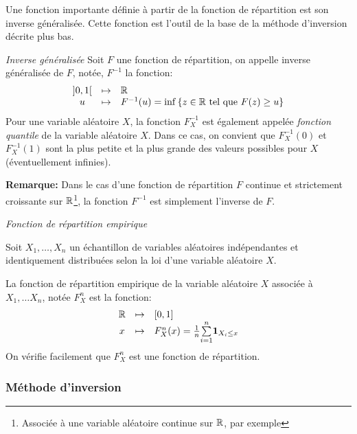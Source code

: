 Une fonction importante définie à partir de la fonction de répartition est son inverse généralisée. 
Cette fonction est l'outil de la base de la méthode d'inversion décrite plus bas.

\begin{definition}{\textit{Inverse généralisée}}
Soit $F$ une fonction de répartition, on appelle inverse généralisée de $F$, notée, $F^{-1}$ la fonction:
\begin{align*}
\begin{array}{ccl}
]0, 1[&\mapsto& \mathbb{R}\\
u &\mapsto& F^{-1}(u) = \inf\left\lbrace z \in \mathbb{R} \text{ tel que } F(z) \geq u \right\rbrace
\end{array}
\end{align*}
Pour une variable aléatoire $X$, la fonction $F_X^{-1}$ est également appelée \textit{fonction quantile} de la variable aléatoire $X$.
Dans ce cas, on convient que $F_X^{-1}(0)$ et $F_X^{-1}(1)$ sont  la plus petite et la plus grande des valeurs possibles pour $X$ (éventuellement infinies).
\end{definition}

\vspace{\baselineskip}
\textbf{Remarque:} Dans le cas d'une fonction de répartition $F$ continue et strictement croissante sur $\mathbb{R}$\footnote{Associée à une variable aléatoire continue sur $\mathbb{R}$, par exemple}, la fonction $F^{-1}$ est simplement l'inverse de $F$.

\begin{definition}{\textit{Fonction de répartition empirique}}

Soit $X_1, \dots, X_n$ un échantillon de variables aléatoires indépendantes et identiquement distribuées selon la loi d'une variable aléatoire $X$.

La fonction de répartition empirique de la variable aléatoire $X$ associée à $X_1,\dots X_n$, notée $F_X^n$ est la fonction:
\[
\begin{array}{ccl}
\mathbb{R} &\mapsto& [0, 1]\\
x &\mapsto& F_X^n(x) = \frac{1}{n}\underset{i=1}{\overset{n}{\sum}} \mathbf{1}_{X_i \leq x}
\end{array}
\]
On vérifie facilement que $F^n_X$ est une fonction de répartition.
\end{definition}


\subsubsection{Méthode d'inversion}

